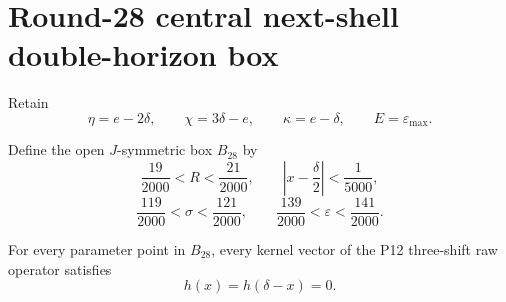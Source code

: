 \section{Round-28 central next-shell double-horizon box}
\label{sec:p12-round28-double-horizon}

Retain
\[
\eta=e-2\delta,\qquad
\chi=3\delta-e,\qquad
\kappa=e-\delta,
\qquad
E=\varepsilon_{\max}.
\]

Define the open \(J\)-symmetric box \(B_{28}\) by
\[
\frac{19}{2000}<R<\frac{21}{2000},
\qquad
\left|x-\frac{\delta}{2}\right|<\frac1{5000},
\]
\[
\frac{119}{2000}<\sigma<\frac{121}{2000},
\qquad
\frac{139}{2000}<\varepsilon<\frac{141}{2000}.
\]

\begin{theorem}
\label{thm:p12-round28-m68}
For every parameter point in \(B_{28}\), every kernel vector of the P12
three-shift raw operator satisfies
\[
\boxed{h(x)=h(\delta-x)=0}.
\]
\end{theorem}

